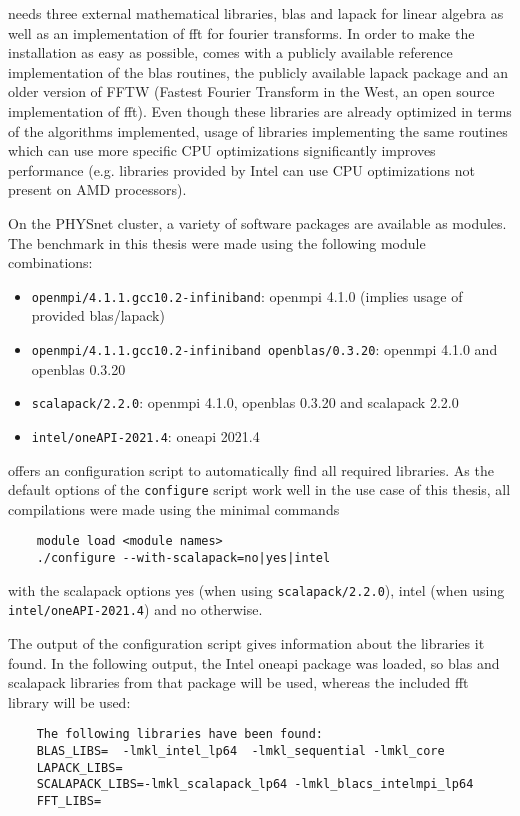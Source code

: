 \documentclass[main.tex]{subfiles}
\begin{document}
\QE needs three external mathematical libraries, \gls{blas} and \gls{lapack} for linear algebra as well as an implementation of \gls{fft} for fourier transforms.
In order to make the installation as easy as possible, \QE comes with a publicly available reference implementation of the \gls{blas} routines, the publicly available \gls{lapack} package and an older version of FFTW (Fastest Fourier Transform in the West, an open source implementation of \gls{fft}).
Even though these libraries are already optimized in terms of the algorithms implemented, usage of libraries implementing the same routines which can use more specific CPU optimizations significantly improves performance (e.g. libraries provided by Intel can use CPU optimizations not present on AMD processors).

On the PHYSnet cluster, a variety of software packages are available as modules.
The benchmark in this thesis were made using the following module combinations:
\begin{itemize}
    \item \texttt{openmpi/4.1.1.gcc10.2-infiniband}: \gls{openmpi} 4.1.0 (implies usage of \QE provided \gls{blas}/\gls{lapack})
    \item \texttt{openmpi/4.1.1.gcc10.2-infiniband openblas/0.3.20}: \gls{openmpi} 4.1.0 and \gls{openblas} 0.3.20
    \item \texttt{scalapack/2.2.0}: \gls{openmpi} 4.1.0, \gls{openblas} 0.3.20 and \gls{scalapack} 2.2.0
    \item \texttt{intel/oneAPI-2021.4}: \gls{oneapi} 2021.4
\end{itemize}

\QE offers an configuration script to automatically find all required libraries.
As the default options of the \texttt{configure} script work well in the use case of this thesis, all compilations were made using the minimal commands
\begin{verbatim}
    module load <module names>
    ./configure --with-scalapack=no|yes|intel
\end{verbatim}
with the scalapack options yes (when using \texttt{scalapack/2.2.0}), intel (when using \\ \texttt{intel/oneAPI-2021.4}) and no otherwise.

The output of the configuration script gives information about the libraries it found.
In the following output, the Intel \gls{oneapi} package was loaded, so \gls{blas} and \gls{scalapack} libraries from that package will be used, whereas the included \gls{fft} library will be used:
\begin{verbatim}
    The following libraries have been found:
    BLAS_LIBS=  -lmkl_intel_lp64  -lmkl_sequential -lmkl_core
    LAPACK_LIBS=
    SCALAPACK_LIBS=-lmkl_scalapack_lp64 -lmkl_blacs_intelmpi_lp64
    FFT_LIBS= 
\end{verbatim}
\end{document}
